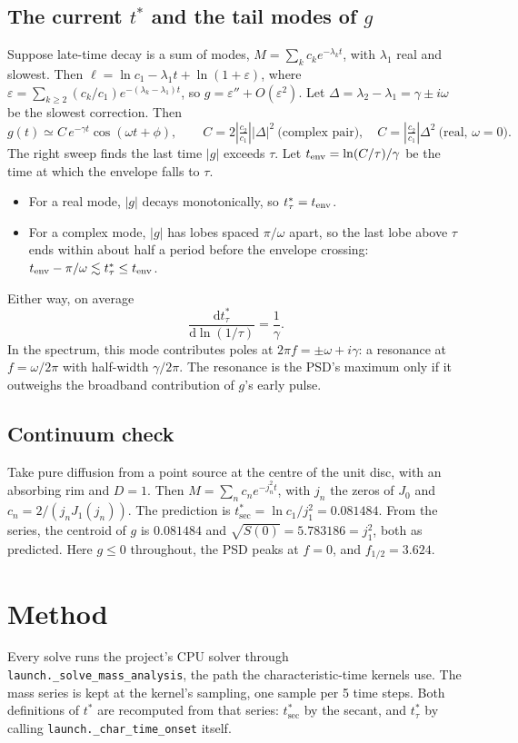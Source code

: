 \documentclass[11pt]{article}
\newcommand{\tsec}{t^*_{\mathrm{sec}}}
\newcommand{\ttau}{t^*_{\tau}}
\newcommand{\dd}{\mathrm{d}}
\begin{document}
\subsection{The current $t^*$ and the tail modes of $g$}
\label{sec:tail}
Suppose late-time decay is a sum of modes, $M=\sum_k c_ke^{-\lambda_kt}$, with
$\lambda_1$ real and slowest. Then
$\ell=\ln c_1-\lambda_1t+\ln(1+\varepsilon)$, where
$\varepsilon=\sum_{k\ge2}(c_k/c_1)e^{-(\lambda_k-\lambda_1)t}$, so
$g=\varepsilon''+O(\varepsilon^2)$. Let $\Delta=\lambda_2-\lambda_1=\gamma\pm i\omega$
be the slowest correction. Then
\[
  g(t)\simeq C\,e^{-\gamma t}\cos(\omega t+\phi),\qquad
  C=2\left|\tfrac{c_2}{c_1}\right||\Delta|^2\ \text{(complex pair)},\quad
  C=\left|\tfrac{c_2}{c_1}\right|\Delta^2\ \text{(real, }\omega=0).
\]
The right sweep finds the last time $|g|$ exceeds $\tau$. Let
$t_{\rm env}=\ln(C/\tau)/\gamma$ be the time at which the envelope falls to
$\tau$.
\begin{itemize}
\item For a real mode, $|g|$ decays monotonically, so $\ttau=t_{\rm env}$.
\item For a complex mode, $|g|$ has lobes spaced $\pi/\omega$ apart, so the last
  lobe above $\tau$ ends within about half a period before the envelope crossing:
  $t_{\rm env}-\pi/\omega\lesssim\ttau\le t_{\rm env}$.
\end{itemize}
Either way, on average
\begin{equation}
  \frac{\dd\ttau}{\dd\ln(1/\tau)}=\frac{1}{\gamma}.
  \label{eq:tausens}
\end{equation}
In the spectrum, this mode contributes poles at $2\pi f=\pm\omega+i\gamma$: a
resonance at $f=\omega/2\pi$ with half-width $\gamma/2\pi$. The resonance is the
PSD's maximum only if it outweighs the broadband contribution of $g$'s early
pulse.

\subsection{Continuum check}
Take pure diffusion from a point source at the centre of the unit disc, with an
absorbing rim and $D=1$. Then $M=\sum_nc_ne^{-j_n^2t}$, with $j_n$ the zeros of
$J_0$ and $c_n=2/(j_nJ_1(j_n))$. The prediction is $\tsec=\ln c_1/j_1^2=0.081484$.
From the series, the centroid of $g$ is $0.081484$ and $\sqrt{S(0)}=5.783186=j_1^2$,
both as predicted. Here $g\le0$ throughout, the PSD peaks at $f=0$, and
$f_{1/2}=3.624$.

\section{Method}
Every solve runs the project's CPU solver through \texttt{launch.\_solve\_mass\_analysis},
the path the characteristic-time kernels use. The mass series is kept at the
kernel's sampling, one sample per 5 time steps. Both definitions of $t^*$ are
recomputed from that series: $\tsec$ by the secant, and $\ttau$ by calling
\texttt{launch.\_char\_time\_onset} itself.
\end{document}
